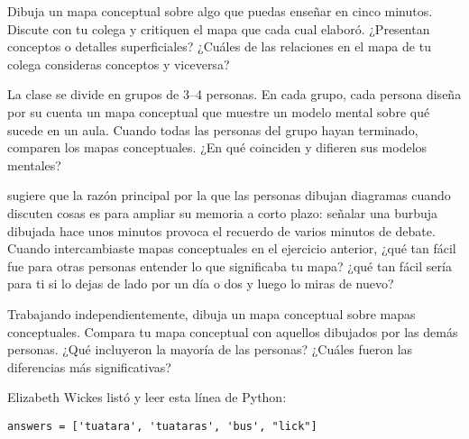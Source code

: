 

Dibuja un mapa conceptual sobre algo que puedas enseñar en cinco minutos.
Discute con tu colega y critiquen el mapa que cada cual elaboró.
¿Presentan conceptos o detalles superficiales?
¿Cuáles de las relaciones en el mapa de tu colega consideras conceptos y viceversa?


La clase se divide en grupos de 3--4 personas.
En cada grupo, cada persona diseña por su cuenta un mapa conceptual que muestre un modelo mental sobre qué sucede en un aula.
Cuando todas las personas del grupo hayan terminado,
comparen los mapas conceptuales.
¿En qué coinciden y difieren sus modelos mentales?


\cite{Cher2007} sugiere que
la razón principal por la que las personas dibujan diagramas cuando discuten cosas
es para ampliar su memoria a corto plazo:
señalar una burbuja dibujada hace unos minutos provoca el recuerdo de varios minutos de debate.
Cuando intercambiaste mapas conceptuales en el ejercicio anterior,
¿qué tan fácil fue para otras personas entender lo que significaba tu mapa?
¿qué tan fácil sería para ti si lo dejas de lado por un día o dos y luego lo miras de nuevo?


Trabajando independientemente,
dibuja un mapa conceptual sobre mapas conceptuales.
Compara tu mapa conceptual con aquellos dibujados por las demás personas.
¿Qué incluyeron la mayoría de las personas?
¿Cuáles fueron las diferencias más significativas?


Elizabeth Wickes listó
y leer esta línea de Python:

\begin{verbatim}
answers = ['tuatara', 'tuataras', 'bus', "lick"]
\end{verbatim}

